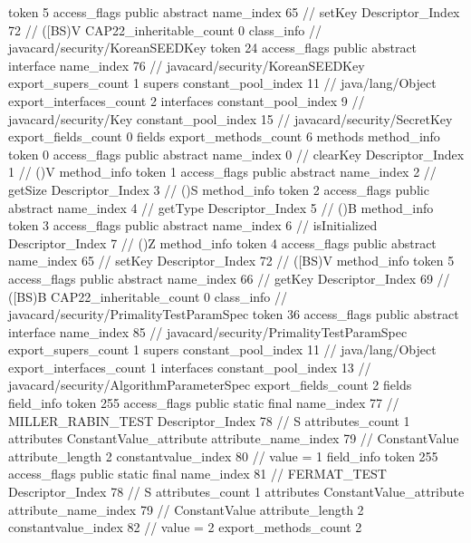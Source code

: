 {{{{{					token	5
					access_flags	public abstract
					name_index	65		// setKey
					Descriptor_Index	72		// ([BS)V
				}
			}
			CAP22_inheritable_count	0
		}
		class_info {		// javacard/security/KoreanSEEDKey
			token	24
			access_flags	public abstract interface
			name_index	76		// javacard/security/KoreanSEEDKey
			export_supers_count	1
			supers {
				constant_pool_index	11		// java/lang/Object
			}
			export_interfaces_count	2
			interfaces {
				constant_pool_index	9		// javacard/security/Key
				constant_pool_index	15		// javacard/security/SecretKey
			}
			export_fields_count	0
			fields {
			}
			export_methods_count	6
			methods {
				method_info {
					token	0
					access_flags	public abstract
					name_index	0		// clearKey
					Descriptor_Index	1		// ()V
				}
				method_info {
					token	1
					access_flags	public abstract
					name_index	2		// getSize
					Descriptor_Index	3		// ()S
				}
				method_info {
					token	2
					access_flags	public abstract
					name_index	4		// getType
					Descriptor_Index	5		// ()B
				}
				method_info {
					token	3
					access_flags	public abstract
					name_index	6		// isInitialized
					Descriptor_Index	7		// ()Z
				}
				method_info {
					token	4
					access_flags	public abstract
					name_index	65		// setKey
					Descriptor_Index	72		// ([BS)V
				}
				method_info {
					token	5
					access_flags	public abstract
					name_index	66		// getKey
					Descriptor_Index	69		// ([BS)B
				}
			}
			CAP22_inheritable_count	0
		}
		class_info {		// javacard/security/PrimalityTestParamSpec
			token	36
			access_flags	public abstract interface
			name_index	85		// javacard/security/PrimalityTestParamSpec
			export_supers_count	1
			supers {
				constant_pool_index	11		// java/lang/Object
			}
			export_interfaces_count	1
			interfaces {
				constant_pool_index	13		// javacard/security/AlgorithmParameterSpec
			}
			export_fields_count	2
			fields {
			field_info {
				token	255
				access_flags	public static final
				name_index	77		// MILLER_RABIN_TEST
				Descriptor_Index	78		// S
				attributes_count	1
				attributes {
				ConstantValue_attribute {
					attribute_name_index	79		// ConstantValue
					attribute_length	2
					constantvalue_index	80		// value = 1
				}
				}
			}
			field_info {
				token	255
				access_flags	public static final
				name_index	81		// FERMAT_TEST
				Descriptor_Index	78		// S
				attributes_count	1
				attributes {
				ConstantValue_attribute {
					attribute_name_index	79		// ConstantValue
					attribute_length	2
					constantvalue_index	82		// value = 2
				}
				}
			}
			}
			export_methods_count	2
}}}
